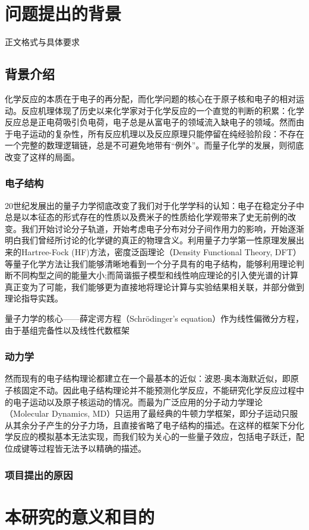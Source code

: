 \section{问题提出的背景}

\par 正文格式与具体要求\cite{zjuthesisrules}

\subsection{背景介绍}
化学反应的本质在于电子的再分配，而化学问题的核心在于原子核和电子的相对运动。反应机理体现了历史以来化学家对于化学反应的一个直觉的判断的积累：化学反应总是正电荷吸引负电荷，电子总是从富电子的领域流入缺电子的领域。然而由于电子运动的复杂性，所有反应机理以及反应原理只能停留在纯经验阶段：不存在一个完整的数理逻辑链，总是不可避免地带有``例外''。而量子化学的发展，则彻底改变了这样的局面。

\subsubsection{电子结构}
20世纪发展出的量子力学彻底改变了我们对于化学学科的认知：电子在稳定分子中总是以本征态的形式存在的性质以及费米子的性质给化学观带来了史无前例的改变。我们开始讨论分子轨道，开始考虑电子分布对分子间作用力的影响，开始逐渐明白我们曾经所讨论的化学键的真正的物理含义。利用量子力学第一性原理发展出来的Hartree-Fock (HF)方法，密度泛函理论（Density Functional Theory, DFT）等量子化学方法让我们能够清晰地看到一个分子具有的电子结构，能够利用理论判断不同构型之间的能量大小;而简谐振子模型和线性响应理论的引入使光谱的计算真正变为了可能，我们能够更为直接地将理论计算与实验结果相关联，并部分做到理论指导实践。

量子力学的核心——薛定谔方程（Schr\"odinger's equation）作为线性偏微分方程，由于基组完备性以及线性代数框架

\subsubsection{动力学}

然而现有的电子结构理论都建立在一个最基本的近似：波恩-奥本海默近似，即原子核固定不动。因此电子结构理论并不能预测化学反应，不能研究化学反应过程中的电子运动以及原子核运动的情况。而最为广泛应用的分子动力学理论（Molecular Dynamics, MD）只运用了最经典的牛顿力学框架，即分子运动只服从其余分子产生的分子力场，且直接省略了电子结构的描述。在这样的框架下分化学反应的模拟基本无法实现，而我们较为关心的一些量子效应，包括电子跃迁，配位成键等过程皆无法予以精确的描述。


\subsubsection{项目提出的原因}

\section{本研究的意义和目的}
